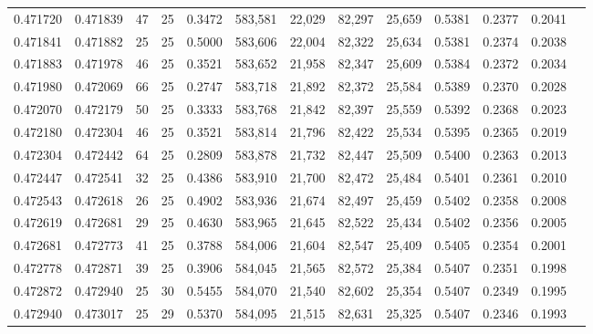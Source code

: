 \begin{tabular}{rrrrrrrrrrrrr}
0.471720 & 0.471839 &    47 &  25 &                                     0.3472 & 583,581 &  22,029 &  82,297 &  25,659 & 0.5381 & 0.2377 & 0.2041 \\
0.471841 & 0.471882 &    25 &  25 &                                     0.5000 & 583,606 &  22,004 &  82,322 &  25,634 & 0.5381 & 0.2374 & 0.2038 \\
0.471883 & 0.471978 &    46 &  25 &                                     0.3521 & 583,652 &  21,958 &  82,347 &  25,609 & 0.5384 & 0.2372 & 0.2034 \\
0.471980 & 0.472069 &    66 &  25 &                                     0.2747 & 583,718 &  21,892 &  82,372 &  25,584 & 0.5389 & 0.2370 & 0.2028 \\
0.472070 & 0.472179 &    50 &  25 &                                     0.3333 & 583,768 &  21,842 &  82,397 &  25,559 & 0.5392 & 0.2368 & 0.2023 \\
0.472180 & 0.472304 &    46 &  25 &                                     0.3521 & 583,814 &  21,796 &  82,422 &  25,534 & 0.5395 & 0.2365 & 0.2019 \\
0.472304 & 0.472442 &    64 &  25 &                                     0.2809 & 583,878 &  21,732 &  82,447 &  25,509 & 0.5400 & 0.2363 & 0.2013 \\
0.472447 & 0.472541 &    32 &  25 &                                     0.4386 & 583,910 &  21,700 &  82,472 &  25,484 & 0.5401 & 0.2361 & 0.2010 \\
0.472543 & 0.472618 &    26 &  25 &                                     0.4902 & 583,936 &  21,674 &  82,497 &  25,459 & 0.5402 & 0.2358 & 0.2008 \\
0.472619 & 0.472681 &    29 &  25 &                                     0.4630 & 583,965 &  21,645 &  82,522 &  25,434 & 0.5402 & 0.2356 & 0.2005 \\
0.472681 & 0.472773 &    41 &  25 &                                     0.3788 & 584,006 &  21,604 &  82,547 &  25,409 & 0.5405 & 0.2354 & 0.2001 \\
0.472778 & 0.472871 &    39 &  25 &                                     0.3906 & 584,045 &  21,565 &  82,572 &  25,384 & 0.5407 & 0.2351 & 0.1998 \\
0.472872 & 0.472940 &    25 &  30 &                                     0.5455 & 584,070 &  21,540 &  82,602 &  25,354 & 0.5407 & 0.2349 & 0.1995 \\
0.472940 & 0.473017 &    25 &  29 &                                     0.5370 & 584,095 &  21,515 &  82,631 &  25,325 & 0.5407 & 0.2346 & 0.1993 \\

\end{tabular}
